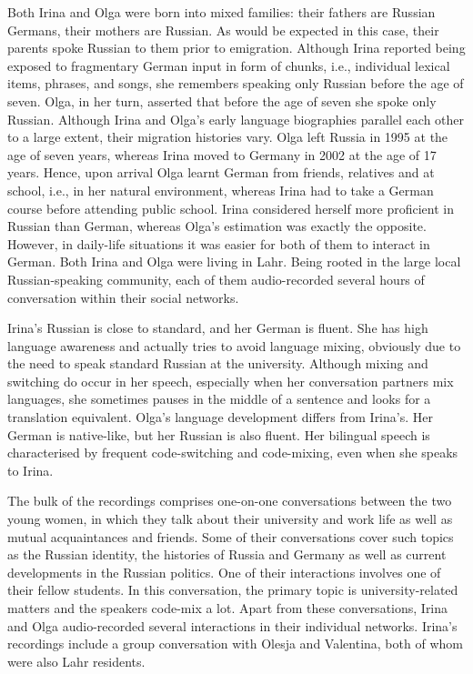 Both Irina and Olga were born into mixed families: their fathers are Russian Germans, their mothers are Russian. As would be expected in this case, their parents spoke Russian to them prior to emigration. Although Irina reported being exposed to fragmentary German input in form of chunks, i.e., individual lexical items, phrases, and songs, she remembers speaking only Russian before the age of seven. Olga, in her turn, asserted that before the age of seven she spoke only Russian. Although Irina and Olga's early language biographies parallel each other to a large extent, their migration histories vary. Olga left Russia in 1995 at the age of seven years, whereas Irina moved to Germany in 2002 at the age of 17 years. Hence, upon arrival Olga learnt German from friends, relatives and at school, i.e., in her natural environment, whereas Irina had to take a German course before attending public school.
Irina considered herself more proficient in Russian than German, whereas Olga's estimation was exactly the opposite. However, in daily-life situations it was easier for both of them to interact in German. Both Irina and Olga were living in Lahr. Being rooted in the large local Russian-speaking community, each of them audio-recorded several hours of conversation within their social networks. 

Irina's Russian is close to standard, and her German is fluent. She has high language awareness and actually tries to avoid language mixing, obviously due to the need to speak standard Russian at the university. Although mixing and switching do occur in her speech, especially when her conversation partners mix languages, she sometimes pauses in the middle of a sentence and looks for a translation equivalent. Olga's language development differs from Irina's. Her German is native-like, but her Russian is also fluent. Her bilingual speech is characterised by frequent code-switching and code-mixing, even when she speaks to Irina.

The bulk of the recordings comprises one-on-one conversations between the two young women, in which they talk about their university and work life as well as mutual acquaintances and friends. Some of their conversations cover such topics as the Russian identity, the histories of Russia and Germany as well as current developments in the Russian politics. One of their interactions involves one of their fellow students. In this conversation, the primary topic is university-related matters and the speakers code-mix a lot. Apart from these conversations, Irina and Olga audio-recorded several interactions in their individual networks. Irina's recordings include a group conversation with Olesja and Valentina, both of whom were also Lahr residents.

